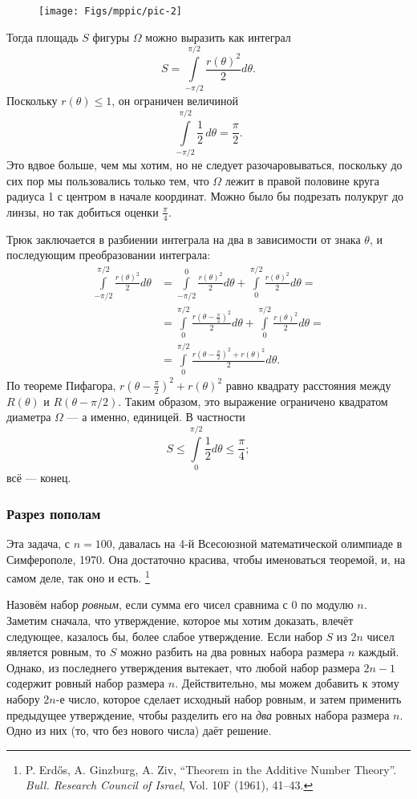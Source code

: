 \begin{figure}
\vskip4mm
\centering
\texttt{[image: Figs/mppic/pic-2]}
\end{figure}

Тогда площадь $S$ фигуры $\Omega$ можно выразить как интеграл
\[S=\int\limits_{-\pi/2}^{\pi/2}\frac{r(\theta)^2}{2}d\theta.\]
Поскольку $r(\theta) \le 1$, он ограничен величиной
\[\int\limits_{-\pi/2}^{\pi/2}\frac{1}{2}\,d\theta=\frac\pi2.\]
Это вдвое больше, чем мы хотим, но не следует разочаровываться, поскольку до сих пор мы пользовались только тем, что $\Omega$ лежит в правой половине круга радиуса 1 с центром в начале координат.
Можно было бы подрезать полукруг до линзы, но так добиться оценки $\tfrac\pi4$.

Трюк заключается в разбиении интеграла на два в зависимости от знака $\theta$, и последующим преобразовании интеграла:
\begin{align*}
\int\limits_{-\pi/2}^{\pi/2}\frac{r(\theta)^2}{2}d\theta&=\int\limits_{-\pi/2}^{0}\frac{r(\theta)^2}{2}d\theta+\int\limits_{0}^{\pi/2}\frac{r(\theta)^2}{2}d\theta=
\\
&=\int\limits_{0}^{\pi/2}\frac{r(\theta-\tfrac\pi2)^2}{2}d\theta+\int\limits_{0}^{\pi/2}\frac{r(\theta)^2}{2}d\theta=
\\
&=\int\limits_{0}^{\pi/2}\frac{r(\theta-\tfrac\pi2)^2+r(\theta)^2}{2}d\theta.
\end{align*}
По теореме Пифагора, $r(\theta-\tfrac\pi2)^2+r(\theta)^2$ равно квадрату расстояния между $R(\theta)$ и $R(\theta- \pi/2)$.
Таким образом, это выражение ограничено квадратом диаметра $\Omega$ --- а именно, единицей.
В частности
\[S\le \int\limits_{0}^{\pi/2}\frac12d\theta\le\frac\pi4;\]
всё --- конец.
\heart

\subsubsection*{Разрез пополам}

Эта задача, с $n=100$, давалась на 4-й Всесоюзной математической олимпиаде в Симферополе, 1970.
Она достаточно красива, чтобы именоваться теоремой, и, на самом деле, так оно и есть.%
\footnote{P. Erd\H{o}s, A. Ginzburg, A. Ziv, ``Theorem in the Additive Number Theory''. \emph{Bull. Research Council of Israel}, Vol. 10F (1961), 41--43.}

\medskip

Назовём набор \emph{ровным}, если сумма его чисел сравнима с $0$ по модулю $n$.
Заметим сначала, что утверждение, которое мы хотим доказать, влечёт следующее, казалось бы, более слабое утверждение. 
Если набор $S$ из $2n$ чисел является ровным, то $S$ можно разбить на два ровных набора размера $n$ каждый.
Однако, из последнего утверждения вытекает, что любой набор размера $2n-1$ содержит ровный набор размера $n$.
Действительно, мы можем добавить к этому набору $2n$-е число, которое сделает исходный набор ровным, и затем применить предыдущее утверждение, чтобы разделить его на \emph{два} ровных набора размера $n$. 
Одно из них (то, что без нового числа) даёт решение.

